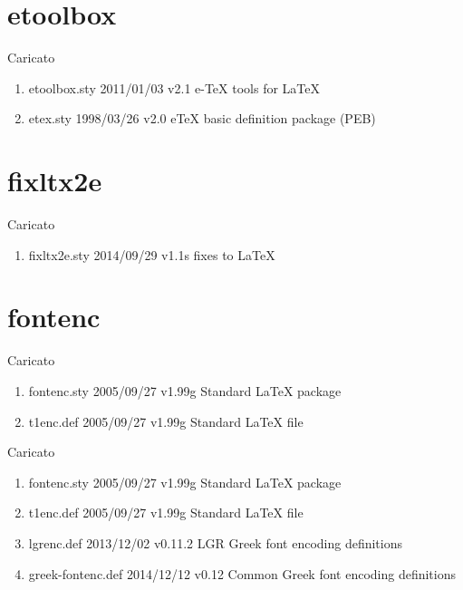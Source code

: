 \section{etoolbox}

Caricato 
\begin{enumerate}
\item etoolbox.sty 2011/01/03 v2.1 e-TeX tools for LaTeX
\item etex.sty 1998/03/26 v2.0 eTeX basic definition package (PEB)
\end{enumerate}
\section{fixltx2e}

Caricato 
\begin{enumerate}
\item fixltx2e.sty 2014/09/29 v1.1s fixes to LaTeX
\end{enumerate}	
\section{fontenc}

Caricato 
\begin{enumerate}
\item fontenc.sty 2005/09/27 v1.99g Standard LaTeX package
\item t1enc.def 2005/09/27 v1.99g Standard LaTeX file
\end{enumerate}

Caricato 
\begin{enumerate}
\item fontenc.sty 2005/09/27 v1.99g Standard LaTeX package
\item t1enc.def 2005/09/27 v1.99g Standard LaTeX file
\item lgrenc.def 2013/12/02 v0.11.2 LGR Greek font encoding definitions
\item greek-fontenc.def 2014/12/12 v0.12 Common Greek font encoding definitions
\end{enumerate}
